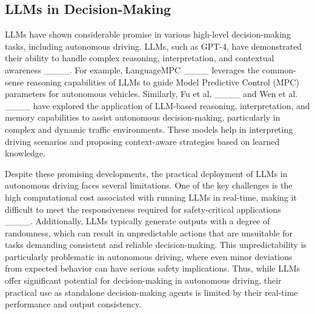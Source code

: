 \subsection{LLMs in Decision-Making}
LLMs have shown considerable promise in various high-level decision-making tasks, including autonomous driving. LLMs, such as GPT-4, have demonstrated their ability to handle complex reasoning, interpretation, and contextual awareness ____. For example, LanguageMPC ____ leverages the common-sense reasoning capabilities of LLMs to guide Model Predictive Control (MPC) parameters for autonomous vehicles. Similarly, Fu et al. ____ and Wen et al. ____ have explored the application of LLM-based reasoning, interpretation, and memory capabilities to assist autonomous decision-making, particularly in complex and dynamic traffic environments. These models help in interpreting driving scenarios and proposing context-aware strategies based on learned knowledge.

Despite these promising developments, the practical deployment of LLMs in autonomous driving faces several limitations. One of the key challenges is the high computational cost associated with running LLMs in real-time, making it difficult to meet the responsiveness required for safety-critical applications ____. Additionally, LLMs typically generate outputs with a degree of randomness, which can result in unpredictable actions that are unsuitable for tasks demanding consistent and reliable decision-making. This unpredictability is particularly problematic in autonomous driving, where even minor deviations from expected behavior can have serious safety implications. Thus, while LLMs offer significant potential for decision-making in autonomous driving, their practical use as standalone decision-making agents is limited by their real-time performance and output consistency.


